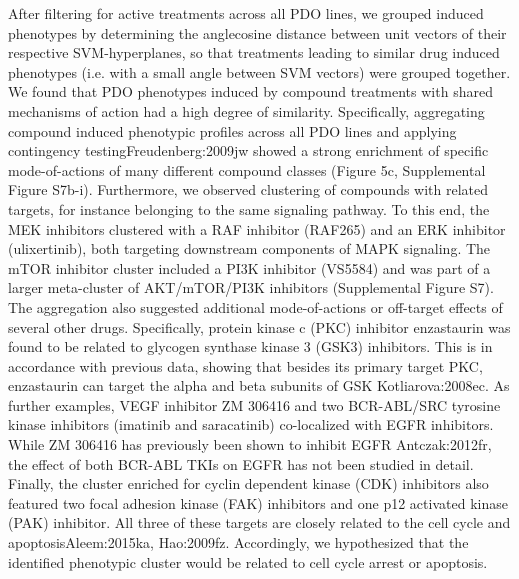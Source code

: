 After filtering for active treatments across all PDO lines, we grouped induced phenotypes by determining the anglecosine distance between unit vectors of their respective SVM-hyperplanes, so that treatments leading to similar drug induced phenotypes (i.e. with a small angle between SVM vectors) were grouped together. We found that PDO phenotypes induced by compound treatments with shared mechanisms of action had a high degree of similarity. Specifically, aggregating compound induced phenotypic profiles across all PDO lines and applying contingency testing{Freudenberg:2009jw} showed a strong enrichment of specific mode-of-actions of many different compound classes (Figure 5c, Supplemental Figure S7b-i). Furthermore, we observed clustering of compounds with related targets, for instance belonging to the same signaling pathway. To this end, the MEK inhibitors clustered with a RAF inhibitor (RAF265) and an ERK inhibitor (ulixertinib), both targeting downstream components of MAPK signaling. The mTOR inhibitor cluster included a PI3K inhibitor (VS5584) and was part of a larger meta-cluster of AKT/mTOR/PI3K inhibitors (Supplemental Figure S7). The aggregation also suggested additional mode-of-actions or off-target effects of several other drugs. Specifically, protein kinase c (PKC) inhibitor enzastaurin was found to be related to glycogen synthase kinase 3 (GSK3) inhibitors. This is in accordance with previous data, showing that besides its primary target PKC, enzastaurin can target the alpha and beta subunits of GSK {Kotliarova:2008ec}. As further examples, VEGF inhibitor ZM 306416 and two BCR-ABL/SRC tyrosine kinase inhibitors (imatinib and saracatinib) co-localized with EGFR inhibitors. While ZM 306416 has previously been shown to inhibit EGFR {Antczak:2012fr}, the effect of both BCR-ABL TKIs on EGFR has not been studied in detail. Finally, the cluster enriched for cyclin dependent kinase (CDK) inhibitors also featured two focal adhesion kinase (FAK) inhibitors and one p12 activated kinase (PAK) inhibitor. All three of these targets are closely related to the cell cycle and apoptosis{Aleem:2015ka, Hao:2009fz}. Accordingly, we hypothesized that the identified phenotypic cluster would be related to cell cycle arrest or apoptosis.
